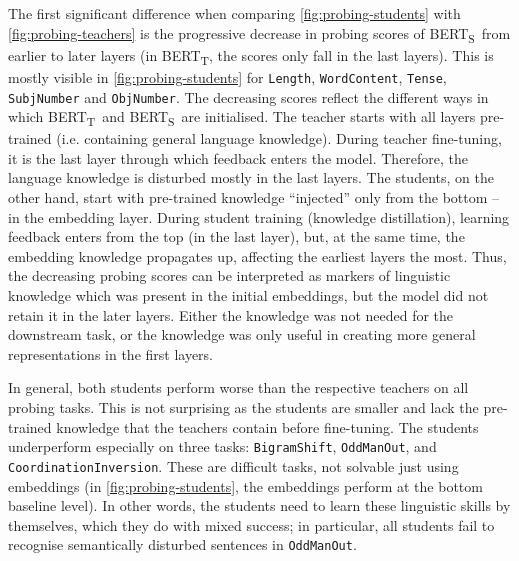\documentclass[bsc,frontabs,singlespacing,parskip,deptreport]{infthesis}
\def\BERTT{BERT\textsubscript{T}}
\def\BERTS{BERT\textsubscript{S}}
\begin{document}
{{{      %
      The first significant difference when comparing \autoref{fig:probing-students} with \autoref{fig:probing-teachers} is the progressive decrease in probing scores of \BERTS~from earlier to later layers (in \BERTT, the scores only fall in the last layers). This is mostly visible in \autoref{fig:probing-students} for \verb|Length|, \verb|WordContent|, \verb|Tense|, \verb|SubjNumber| and \verb|ObjNumber|. 
      The decreasing scores reflect the different ways in which \BERTT~and \BERTS~are initialised. The teacher starts with all layers pre-trained (i.e. containing general language knowledge). During teacher fine-tuning, it is the last layer through which feedback enters the model. Therefore, the language knowledge is disturbed mostly in the last layers.
      The students, on the other hand, start with pre-trained knowledge ``injected'' only from the bottom -- in the embedding layer. During student training (knowledge distillation), learning feedback enters from the top (in the last layer), but, at the same time, the embedding knowledge propagates up, affecting the earliest layers the most.
      Thus, the decreasing probing scores can be interpreted as markers of linguistic knowledge which was present in the initial embeddings, but the model did not retain it in the later layers. Either the knowledge was not needed for the downstream task, or the knowledge was only useful in creating more general representations in the first layers.

      In general, both students perform worse than the respective teachers on all probing tasks. This is not surprising as the students are smaller and lack the pre-trained knowledge that the teachers contain before fine-tuning. The students underperform especially on three tasks: \verb|BigramShift|, \verb|OddManOut|, and \verb|CoordinationInversion|. These are difficult tasks, not solvable just using embeddings (in \autoref{fig:probing-students}, the embeddings perform at the bottom baseline level). In other words, the students need to learn these linguistic skills by themselves, which they do with mixed success; in particular, all students fail to recognise semantically disturbed sentences in \verb|OddManOut|.

}}}
\end{document}
